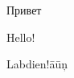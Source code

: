 \documentclass{article}
\begin{document}
Привет

\begin{english}
Hello! 

\end{english}
\begin{latvian}
Labdien!āūņ

\end{latvian}
\end{document}
